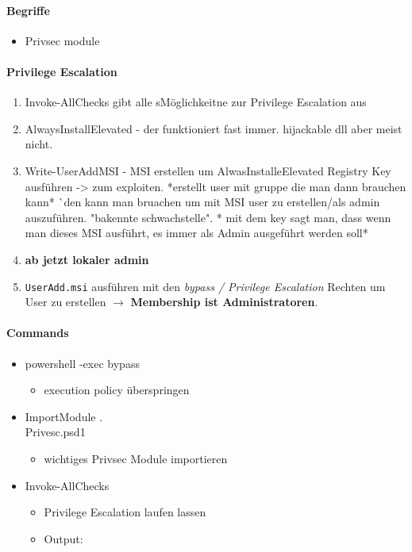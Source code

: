 \paragraph{Begriffe}

\begin{itemize}
    \item Privsec module
\end{itemize}

\paragraph{Privilege Escalation}
\begin{enumerate}
    \item Invoke-AllChecks gibt alle sMöglichkeitne zur Privilege Escalation aus
    \item AlwaysInstallElevated - der funktioniert fast immer. hijackable dll aber meist nicht.
    \item Write-UserAddMSI - MSI erstellen um AlwasInstalleElevated Registry Key ausführen -> zum exploiten. *erstellt user mit gruppe die man dann brauchen kann*
    ^^ den kann man bruachen um mit MSI user zu erstellen/als admin auszuführen. "bakennte schwachstelle". * mit dem key sagt man, dass wenn man dieses MSI ausführt, es immer als Admin ausgeführt werden soll* 
    \item \textbf{ab jetzt lokaler admin}
    \item \lstinline|UserAdd.msi| ausführen mit den \textit{bypass / Privilege Escalation} Rechten um User zu erstellen $\rightarrow$ \textbf{Membership ist Administratoren}.
\end{enumerate}

\paragraph{Commands}
\begin{itemize}
    \item powershell -exec bypass
    \begin{itemize}
        \item execution policy überspringen
    \end{itemize}
    \item Import\-Module .\\Privesc.psd1
    \begin{itemize}
        \item wichtiges Privsec Module importieren
    \end{itemize}
    \item Invoke-AllChecks
    \begin{itemize}
        \item Privilege Escalation laufen lassen
        \item Output:
    \end{itemize}
\end{itemize}


